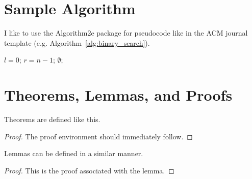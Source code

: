 \section{Sample Algorithm}

I like to use the Algorithm2e package for pseudocode like in the ACM journal template (e.g. Algorithm~\ref{alg:binary_search}).

\begin{algorithm}
\caption{Find the index of an element in an ordered list.}
\label{alg:binary_search}
$l = 0$;
$r = n - 1$;
\Return $\emptyset$;
\end{algorithm}

\section{Theorems, Lemmas, and Proofs}

\begin{theorem}
    Theorems are defined like this.
\end{theorem}
\begin{proof}
    The proof environment should immediately follow.
\end{proof}

\begin{lemma}
    Lemmas can be defined in a similar manner.
\end{lemma}
\begin{proof}
    This is the proof associated with the lemma.
\end{proof}
